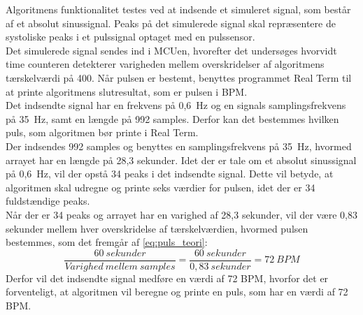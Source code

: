 Algoritmens funktionalitet testes ved at indsende et simuleret signal, som består af et absolut sinussignal. Peaks på det simulerede signal skal repræsentere de systoliske peaks i et pulssignal optaget med en pulssensor.\\
Det simulerede signal sendes ind i MCUen, hvorefter det undersøges hvorvidt time counteren detekterer varigheden mellem overskridelser af algoritmens tærskelværdi på 400. Når pulsen er bestemt, benyttes programmet Real Term til at printe algoritmens slutresultat, som er pulsen i BPM. \\
Det indsendte signal har en frekvens på 0,6~Hz og en signals samplingsfrekvens på 35~Hz, samt en længde på 992 samples. Derfor kan det bestemmes hvilken puls, som algoritmen bør printe i Real Term. \\
Der indsendes 992 samples og benyttes en samplingsfrekvens på 35~Hz, hvormed arrayet har en længde på 28,3 sekunder. Idet der er tale om et absolut sinussignal på 0,6~Hz, vil der opstå 34 peaks i det indsendte signal. Dette vil betyde, at algoritmen skal udregne og printe seks værdier for pulsen, idet der er 34 fuldstændige peaks. \\
Når der er 34 peaks og arrayet har en varighed af 28,3 sekunder, vil der være 0,83 sekunder mellem hver overskridelse af tærskelværdien, hvormed pulsen bestemmes, som det fremgår af \eqref{eq:puls_teori}:
\begin{equation}
\frac{60~sekunder}{Varighed~mellem~samples} = \frac{60~sekunder}{0,83~sekunder} = 72~BPM
\label{eq:puls_teori}
\end{equation} 
Derfor vil det indsendte signal medføre en værdi af 72 BPM, hvorfor det er forventeligt, at algoritmen vil beregne og printe en puls, som har en værdi af 72 BPM.

